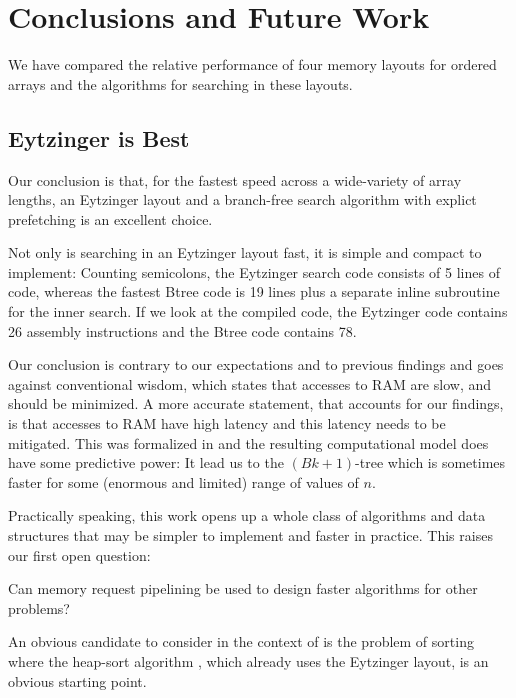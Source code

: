 \documentclass{patmorin}
\begin{document}
\section{Conclusions and Future Work}

We have compared the relative performance of four memory layouts for
ordered arrays and the algorithms for searching in these layouts.

\subsection{Eytzinger is Best}
Our conclusion is that, for the fastest speed across a wide-variety of
array lengths, an Eytzinger layout and a branch-free search algorithm
with explict prefetching is an excellent choice.

Not only is searching in an Eytzinger layout fast, it is simple and
compact to implement: Counting semicolons, the Eytzinger search code
consists of 5 lines of code, whereas the fastest Btree code is 19 lines
plus a separate inline subroutine for the inner search.  If we look at
the compiled code, the Eytzinger code contains 26 assembly instructions
and the Btree code contains 78.

Our conclusion is contrary to our expectations and to previous findings
and goes against conventional wisdom, which states that accesses to
RAM are slow, and should be minimized.  A more accurate statement, that
accounts for our findings, is that accesses to RAM have high latency and
this latency needs to be mitigated.  This was formalized in 
and the resulting computational model does have some predictive power:
It lead us to the $(Bk+1)$-tree which is sometimes faster for some
(enormous and limited) range of values of $n$.

Practically speaking, this work opens up a whole class of algorithms
and data structures that may be simpler to implement and faster in
practice.  This raises our first open question:

\begin{op}
  Can memory request pipelining be used to design faster algorithms for
  other problems?
\end{op}

An obvious candidate to consider in the context of 
is the problem of sorting where the heap-sort algorithm
\cite{floyd:algorithm,williams:algorithm}, which already uses the
Eytzinger layout, is an obvious starting point.
\end{document}
